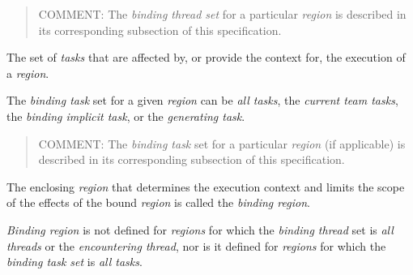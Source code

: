 \begin{quote}
COMMENT: The \emph{binding thread set} for a particular \emph{region} 
is described in its corresponding subsection of this specification.
\end{quote}
\glossarydefend

\glossarydefstart
The set of \emph{tasks} that are affected by, or provide the context for, 
the execution of a \emph{region}.

The \emph{binding task} set for a given \emph{region} can be \emph{all tasks},
the \emph{current team tasks}, the \emph{binding implicit task}, or the 
\emph{generating task}.

\begin{quote}
COMMENT: The \emph{binding task} set for a particular \emph{region} (if 
applicable) is described in its corresponding subsection of this specification.
\end{quote}
\glossarydefend

\glossarydefstart
The enclosing \emph{region} that determines the execution context and limits 
the scope of the effects of the bound \emph{region} is called the 
\emph{binding region}.

\emph{Binding region} is not defined for \emph{regions} for which the 
\emph{binding thread} set is \emph{all threads} or the 
\emph{encountering thread}, nor is it defined for \emph{regions} for 
which the \emph{binding task set} is \emph{all tasks}.

